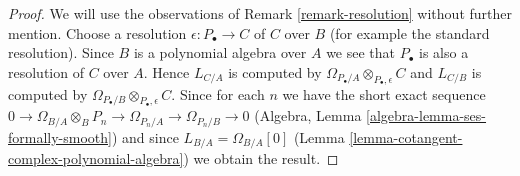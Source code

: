 \begin{proof}
We will use the observations of Remark \ref{remark-resolution}
without further mention. Choose a resolution $\epsilon : P_\bullet \to C$
of $C$ over $B$ (for example the standard resolution). Since $B$ is a
polynomial algebra over $A$ we see that $P_\bullet$ is also a resolution of
$C$ over $A$. Hence $L_{C/A}$ is computed by
$\Omega_{P_\bullet/A} \otimes_{P_\bullet, \epsilon} C$
and $L_{C/B}$ is computed by
$\Omega_{P_\bullet/B} \otimes_{P_\bullet, \epsilon} C$.
Since for each $n$ we have the short exact sequence
$0 \to \Omega_{B/A} \otimes_B P_n \to \Omega_{P_n/A} \to \Omega_{P_n/B} \to 0$
(Algebra, Lemma \ref{algebra-lemma-ses-formally-smooth})
and since $L_{B/A} = \Omega_{B/A}[0]$
(Lemma \ref{lemma-cotangent-complex-polynomial-algebra})
we obtain the result.
\end{proof}

